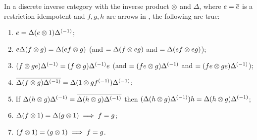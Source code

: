 \begin{lemma}\label{lem:properties_of_delta_and_tensor_in_a_discrete_inverse_category}
  In a discrete inverse category \X with the inverse product $\otimes$ and $\Delta$, where
  $e=\overline{e}$ is a restriction idempotent and $f,g,h$ are arrows in \X, the following are true:
  \begin{enumerate}[{(}i{)}]
    \item{}$e=\Delta (e\otimes 1) {\Delta}^{(-1)}$;\label{le:eisde1}
    \item{}$e\Delta (f \otimes g) = \Delta (e f \otimes g) $ (and $= \Delta (f \otimes e g) $ and
      $ = \Delta (e f \otimes e g)$);\label{le:deltaefg}
    \item{}$ (f \otimes g e) {\Delta}^{(-1)} =(f \otimes g) {\Delta}^{(-1)} e $ (and $= (f e\otimes g) {\Delta}^{(-1)}$ and
      $ = (f e\otimes g e){\Delta}^{(-1)}$);\label{le:efginvdelta}
    \item{}$\overline{\Delta (f \otimes g) {\Delta}^{(-1)}} =
       \Delta(1\otimes g {f}^{(-1)}){\Delta}^{(-1)}$; \label{le:restfg}
    \item{} If $\Delta (h \otimes g) {\Delta}^{(-1)} = \overline{\Delta (h \otimes g) {\Delta}^{(-1)}}$ then
      $(\Delta (h \otimes g) {\Delta}^{(-1)}) h = \Delta (h \otimes g) {\Delta}^{(-1)}$;\label{le:hge}
    \item{}$\Delta (f\otimes1) = \Delta (g\otimes1) \implies f = g$;\label{le:dfgisfg}
    \item{}$(f\otimes1) = (g\otimes1) \implies f = g$.\label{le:fgisfg}
  \end{enumerate}
\end{lemma}
